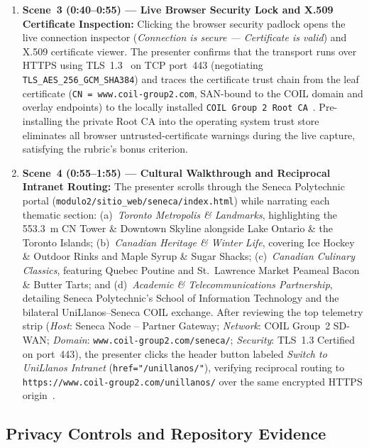 \begin{enumerate}
    \item \textbf{Scene~3 (0:40--0:55) --- Live Browser Security Lock and X.509 Certificate Inspection:} Clicking the browser security padlock opens the live connection inspector (\textit{Connection is secure --- Certificate is valid}) and X.509 certificate viewer. The presenter confirms that the transport runs over HTTPS using TLS~1.3~\cite{rfc8446} on TCP port~443 (negotiating \texttt{TLS\_AES\_256\_\allowbreak GCM\_SHA384}) and traces the certificate trust chain from the leaf certificate (\texttt{CN = www.coil-group2.com}, SAN-bound to the COIL domain and overlay endpoints) to the locally installed \texttt{COIL Group 2 Root CA}~\cite{rfc5280}. Pre-installing the private Root CA into the operating system trust store eliminates all browser untrusted-certificate warnings during the live capture, satisfying the rubric's bonus criterion.

    \item \textbf{Scene~4 (0:55--1:55) --- Cultural Walkthrough and Reciprocal Intranet Routing:} The presenter scrolls through the Seneca Polytechnic portal (\texttt{modulo2/\allowbreak sitio\_web/\allowbreak seneca/\allowbreak index.html}) while narrating each thematic section: (a)~\textit{Toronto Metropolis \& Landmarks}, highlighting the \qty{553.3}{\meter} CN Tower \& Downtown Skyline alongside Lake Ontario \& the Toronto Islands; (b)~\textit{Canadian Heritage \& Winter Life}, covering Ice Hockey \& Outdoor Rinks and Maple Syrup \& Sugar Shacks; (c)~\textit{Canadian Culinary Classics}, featuring Quebec Poutine and St.~Lawrence Market Peameal Bacon \& Butter Tarts; and (d)~\textit{Academic \& Telecommunications Partnership}, detailing Seneca Polytechnic's School of Information Technology and the bilateral UniLlanos--Seneca COIL exchange. After reviewing the top telemetry strip (\textit{Host}: Seneca Node -- Partner Gateway; \textit{Network}: COIL Group~2 SD-WAN; \textit{Domain}: \texttt{www.coil-group2.com/\allowbreak seneca/}; \textit{Security}: TLS~1.3 Certified on port~443), the presenter clicks the header button labeled \textit{Switch to UniLlanos Intranet} (\texttt{href="/unillanos/"}), verifying reciprocal routing to \texttt{https://\allowbreak www.coil-group2.com/\allowbreak unillanos/} over the same encrypted HTTPS origin~\cite{rfc9110,rfc8446}.
\end{enumerate}

\subsection{Privacy Controls and Repository Evidence}
\label{subsec:video_privacy}

